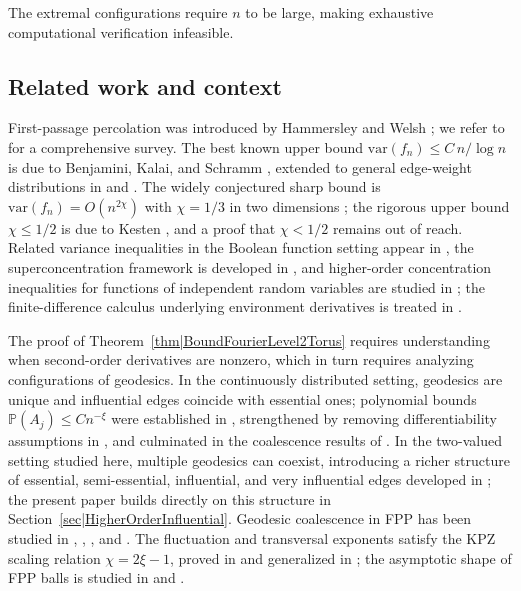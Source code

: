 \documentclass[reqno]{amsart}
\begin{document}
The extremal configurations require $n$ to be large, making exhaustive computational verification infeasible.




\subsection{Related work and context}

First-passage percolation was introduced by Hammersley and Welsh
\cite{HammersleyWelsh1965}; we refer to \cite{AuffingerDamronHanson2017}
for a comprehensive survey. The best known upper bound
$\mathrm{var}(f_n)\leq C\,n/\log n$ is due to Benjamini, Kalai, and
Schramm \cite{benjamini2006}, extended to general edge-weight
distributions in \cite{benaim2008} and \cite{DamronHansonSosoe2015}.
The widely conjectured sharp bound is $\mathrm{var}(f_n)=O(n^{2\chi})$
with $\chi=1/3$ in two dimensions \cite{AuffingerDamronHanson2017};
the rigorous upper bound $\chi\leq 1/2$ is due to Kesten
\cite{Kesten1993}, and a proof that $\chi<1/2$ remains out of reach.
Related variance inequalities in the Boolean function setting appear
in \cite{Przybylowski2024}, the superconcentration framework is
developed in \cite{chatterjee2014}, and higher-order concentration
inequalities for functions of independent random variables are studied
in \cite{BobkovGotzeSambale2019}; the finite-difference calculus
underlying environment derivatives is treated in \cite{ODonnell2014}.

The proof of Theorem~\ref{thm|BoundFourierLevel2Torus} requires
understanding when second-order derivatives are nonzero, which in turn
requires analyzing configurations of geodesics. In the continuously
distributed setting, geodesics are unique and influential edges coincide
with essential ones; polynomial bounds $\mathbb{P}(A_j)\leq Cn^{-\xi}$
were established in \cite{DamronHanson2017}, strengthened by removing
differentiability assumptions in \cite{AhlbergHoffman2019}, and
culminated in the coalescence results of \cite{DembinElboimPeled2024}.
In the two-valued setting studied here, multiple geodesics can coexist,
introducing a richer structure of essential, semi-essential, influential,
and very influential edges developed in \cite{FirstPaper2025}; the
present paper builds directly on this structure in
Section~\ref{sec|HigherOrderInfluential}. Geodesic coalescence in FPP
has been studied in \cite{Hoffman2008}, \cite{Alexander2023},
\cite{Seppalainen2020}, and \cite{KrishnanRassoulAghaSeppalainen2023}.
The fluctuation and transversal exponents satisfy the KPZ scaling
relation $\chi=2\xi-1$, proved in \cite{NewmanPiza1995,chatterjee2013}
and generalized in \cite{AuffingerDamron2014}; the asymptotic shape of
FPP balls is studied in \cite{CoxDurrett1981} and
\cite{ChatterjeeDey2016}.
\end{document}
